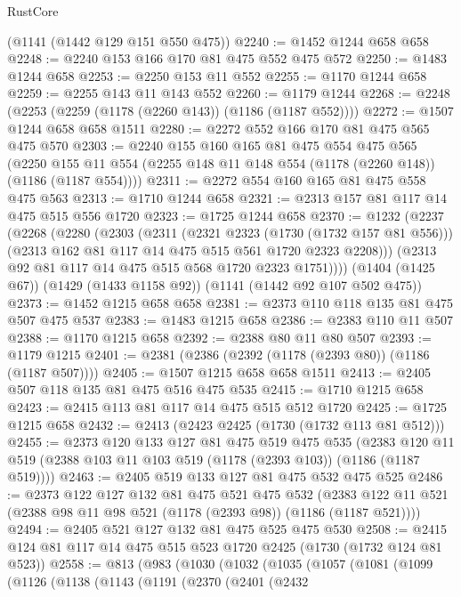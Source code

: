 \begin{lexlean}{RustCore}
\begin{coremodule}
    (@1141 (@1442 @129 @151 @550 @475))
@2240 := @1452 @1244 @658 @658
@2248 := @2240 @153 @166 @170 @81 @475 @552 @475 @572
@2250 := @1483 @1244 @658
@2253 := @2250 @153 @11 @552
@2255 := @1170 @1244 @658
@2259 := @2255 @143 @11 @143 @552
@2260 := @1179 @1244
@2268 := @2248 (@2253 (@2259 (@1178 (@2260 @143)) (@1186 (@1187 @552))))
@2272 := @1507 @1244 @658 @658 @1511
@2280 := @2272 @552 @166 @170 @81 @475 @565 @475 @570
@2303 := @2240
    @155
    @160
    @165
    @81
    @475
    @554
    @475
    @565
    (@2250 @155 @11 @554 (@2255 @148 @11 @148 @554 (@1178 (@2260 @148)) (@1186 (@1187 @554))))
@2311 := @2272 @554 @160 @165 @81 @475 @558 @475 @563
@2313 := @1710 @1244 @658
@2321 := @2313 @157 @81 @117 @14 @475 @515 @556 @1720
@2323 := @1725 @1244 @658
@2370 := @1232
    (@2237
      (@2268
        (@2280
          (@2303
            (@2311
              (@2321 @2323 (@1730 (@1732 @157 @81 @556)))
              (@2313 @162 @81 @117 @14 @475 @515 @561 @1720 @2323 @2208)))
          (@2313 @92 @81 @117 @14 @475 @515 @568 @1720 @2323 @1751))))
    (@1404 (@1425 @67))
    (@1429 (@1433 @1158 @92))
    (@1141 (@1442 @92 @107 @502 @475))
@2373 := @1452 @1215 @658 @658
@2381 := @2373 @110 @118 @135 @81 @475 @507 @475 @537
@2383 := @1483 @1215 @658
@2386 := @2383 @110 @11 @507
@2388 := @1170 @1215 @658
@2392 := @2388 @80 @11 @80 @507
@2393 := @1179 @1215
@2401 := @2381 (@2386 (@2392 (@1178 (@2393 @80)) (@1186 (@1187 @507))))
@2405 := @1507 @1215 @658 @658 @1511
@2413 := @2405 @507 @118 @135 @81 @475 @516 @475 @535
@2415 := @1710 @1215 @658
@2423 := @2415 @113 @81 @117 @14 @475 @515 @512 @1720
@2425 := @1725 @1215 @658
@2432 := @2413 (@2423 @2425 (@1730 (@1732 @113 @81 @512)))
@2455 := @2373
    @120
    @133
    @127
    @81
    @475
    @519
    @475
    @535
    (@2383 @120 @11 @519 (@2388 @103 @11 @103 @519 (@1178 (@2393 @103)) (@1186 (@1187 @519))))
@2463 := @2405 @519 @133 @127 @81 @475 @532 @475 @525
@2486 := @2373
    @122
    @127
    @132
    @81
    @475
    @521
    @475
    @532
    (@2383 @122 @11 @521 (@2388 @98 @11 @98 @521 (@1178 (@2393 @98)) (@1186 (@1187 @521))))
@2494 := @2405 @521 @127 @132 @81 @475 @525 @475 @530
@2508 := @2415 @124 @81 @117 @14 @475 @515 @523 @1720 @2425 (@1730 (@1732 @124 @81 @523))
@2558 := @813
    (@983
      (@1030
        (@1032
          (@1035
            (@1057
              (@1081
                (@1099
                  (@1126
                    (@1138
                      (@1143
                        (@1191
                          (@2370
                            (@2401
                              (@2432

\end{coremodule}
\end{lexlean}
